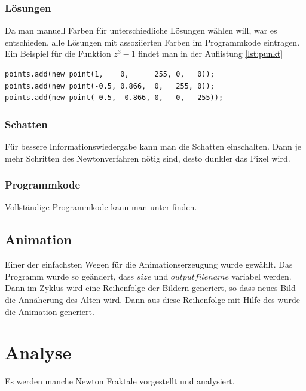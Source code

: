 \documentclass[a4paper,12pt]{llncs}
\numberwithin{equation}{section}
\begin{document}
\subsubsection{Lösungen} 
Da man manuell Farben für unterschiedliche Lösungen wählen will, war es entschieden, alle Lösungen mit assoziierten Farben im Programmkode eintragen. 
Ein Beispiel für die Funktion $z^3 - 1$ findet man in der Auflistung \ref{lst:punkt}
\begin{lstlisting}[caption=Lösungen mit Farben für $z^3 - 1$, label=lst:punkt]
points.add(new point(1,	   0,	   255, 0,   0));
points.add(new point(-0.5, 0.866,  0,   255, 0));
points.add(new point(-0.5, -0.866, 0,   0,   255));
\end{lstlisting}
\subsubsection{Schatten}
Für bessere Informationswiedergabe kann man die Schatten einschalten.
Dann je mehr Schritten des Newtonverfahren nötig sind, desto dunkler das Pixel wird.  
\subsubsection{Programmkode}
Vollständige Programmkode kann man unter \cite{source} finden.
\subsection{Animation}\label{subs:vis:anime}
Einer der einfachsten Wegen für die Animationserzeugung wurde gewählt. 
Das Programm wurde so geändert, dass $size$ und $outputfilename$ variabel werden. 
Dann im Zyklus wird eine Reihenfolge der Bildern generiert, so dass neues Bild die Annäherung des Alten wird.
Dann aus diese Reihenfolge mit Hilfe des \cite{animegen} wurde die Animation generiert.
\section{Analyse}\label{sec:analy}
Es werden manche Newton Fraktale vorgestellt und analysiert.
\end{document}
